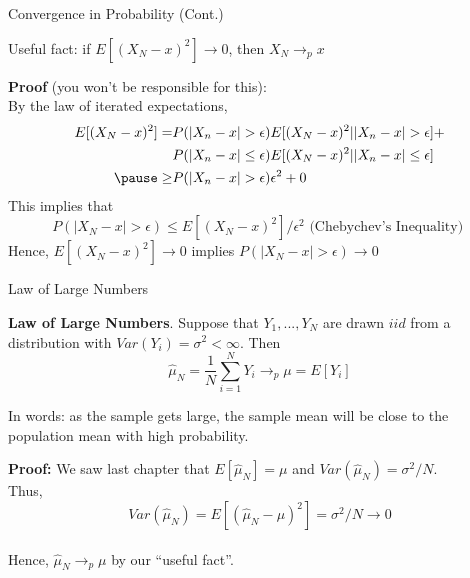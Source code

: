 \documentclass[11pt,english,handout]{beamer}
\newenvironment{wideitemize}{\itemize\addtolength{\itemsep}{10pt}}{\enditemize}
\begin{document}
\begin{frame}{Convergence in Probability (Cont.)}
	
\begin{wideitemize}

\item Useful fact: if $E[ (X_N - x)^2 ] \rightarrow 0$, then $X_N \rightarrow_p x$

\pause

\item 
\textbf{Proof} (you won't be responsible for this): \\

By the law of iterated expectations, 
\begin{align*}
E[ (X_N - x)^2 ]=& P( |X_n - x| > \epsilon ) E[ (X_N - x)^2 | |X_n - x| > \epsilon ] + \\
& P( |X_n - x| \leq \epsilon ) E[ (X_N - x)^2 | |X_n - x| \leq \epsilon ]	 \\
\pause \geq &  P( |X_n - x| > \epsilon ) \epsilon^2 + 0 
\end{align*}
\pause
\noindent This implies that 
$$P( |X_N - x|  > \epsilon ) \leq E[ (X_N - x)^2  ] / \epsilon^2 \text{ (Chebychev's Inequality)  }$$
\pause 
Hence, $E[ (X_N - x)^2  ] \rightarrow 0$ implies $P( |X_N - x|  > \epsilon ) \rightarrow 0$

\end{wideitemize}	
\end{frame}


\begin{frame}{Law of Large Numbers}
	
\begin{wideitemize}
	
\item \textbf{Law of Large Numbers}. Suppose that $Y_1,...,Y_N$ are drawn $iid$ from a distribution with $Var(Y_i) = \sigma^2 < \infty$. Then $$\hat\mu_N = \frac{1}{N} \sum_{i=1}^{N} Y_i \rightarrow_p \mu = E[Y_i]$$

\item
In words: as the sample gets large, the sample mean will be close to the population mean with high probability.

\pause
\item
\textbf{Proof:} We saw last chapter that $E[\hat\mu_N] = \mu$ and $Var(\hat\mu_N) = \sigma^2 / N$.  \\

Thus, $$Var(\hat\mu_N) = E[ (\hat\mu_N - \mu )^2 ] = \sigma^2/N \rightarrow 0 $$ \\

Hence, $\hat\mu_N \rightarrow_p \mu$ by our ``useful fact''. 
\end{wideitemize}	
	
\end{frame}
\end{document}
